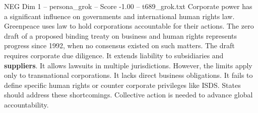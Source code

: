\begin{textsample}{NEG Dim 1 – persona\_grok – Score -1.00 – t689\_grok.txt}  \label{ex:f1_neg_027}
Corporate power has a significant influence on governments and international human rights law.
Greenpeace uses law to hold corporations accountable for their actions.
The zero draft of a proposed binding treaty on business and human rights represents progress since 1992, when no consensus existed on such matters.
The draft requires corporate due diligence.
It extends liability to subsidiaries and \textbf{suppliers}.
It allows lawsuits in multiple jurisdictions.
However, the limits apply only to transnational corporations.
It lacks direct business obligations.
It fails to define specific human rights or counter corporate privileges like ISDS.
States should address these shortcomings.
Collective action is needed to advance global accountability.

\end{textsample}
